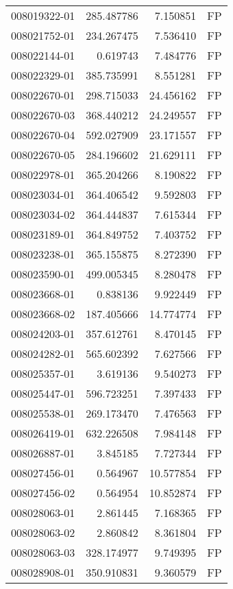 \begin{tabular}{lrrl}
008019322-01 &  285.487786 &     7.150851 &   FP \\
008021752-01 &  234.267475 &     7.536410 &   FP \\
008022144-01 &    0.619743 &     7.484776 &   FP \\
008022329-01 &  385.735991 &     8.551281 &   FP \\
008022670-01 &  298.715033 &    24.456162 &   FP \\
008022670-03 &  368.440212 &    24.249557 &   FP \\
008022670-04 &  592.027909 &    23.171557 &   FP \\
008022670-05 &  284.196602 &    21.629111 &   FP \\
008022978-01 &  365.204266 &     8.190822 &   FP \\
008023034-01 &  364.406542 &     9.592803 &   FP \\
008023034-02 &  364.444837 &     7.615344 &   FP \\
008023189-01 &  364.849752 &     7.403752 &   FP \\
008023238-01 &  365.155875 &     8.272390 &   FP \\
008023590-01 &  499.005345 &     8.280478 &   FP \\
008023668-01 &    0.838136 &     9.922449 &   FP \\
008023668-02 &  187.405666 &    14.774774 &   FP \\
008024203-01 &  357.612761 &     8.470145 &   FP \\
008024282-01 &  565.602392 &     7.627566 &   FP \\
008025357-01 &    3.619136 &     9.540273 &   FP \\
008025447-01 &  596.723251 &     7.397433 &   FP \\
008025538-01 &  269.173470 &     7.476563 &   FP \\
008026419-01 &  632.226508 &     7.984148 &   FP \\
008026887-01 &    3.845185 &     7.727344 &   FP \\
008027456-01 &    0.564967 &    10.577854 &   FP \\
008027456-02 &    0.564954 &    10.852874 &   FP \\
008028063-01 &    2.861445 &     7.168365 &   FP \\
008028063-02 &    2.860842 &     8.361804 &   FP \\
008028063-03 &  328.174977 &     9.749395 &   FP \\
008028908-01 &  350.910831 &     9.360579 &   FP \\

\end{tabular}
